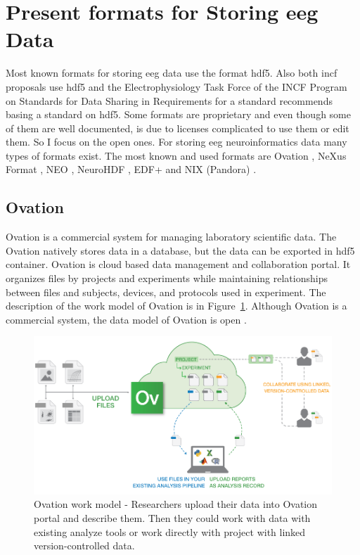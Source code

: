 \section{Present formats for Storing \gls{eeg} Data}
Most known formats for storing \gls{eeg} data use the format \gls{hdf5}. Also both \gls{incf} proposals use \gls{hdf5} and the Electrophysiology Task Force of the INCF Program on Standards for Data Sharing in Requirements for a standard recommends basing a standard on \gls{hdf5}. \cite{requirements} Some formats are proprietary and even though some of them are well documented, is due to licenses complicated to use them or edit them. So I focus on the open ones. For storing \gls{eeg} neuroinformatics data many types of formats exist. The most known and used formats are Ovation \cite{ovation}, NeXus Format \cite{nexus}, NEO \cite{neo}, NeuroHDF \cite{neurohdf}, EDF+ \cite{kemp2003} and NIX (Pandora) \cite{pandora}. 

\subsection{Ovation}
Ovation is a commercial system for managing laboratory scientific data. The Ovation natively stores data in a database, but the data can be exported in \gls{hdf5} container. Ovation is cloud based data management and collaboration portal. It organizes files by projects and experiments while maintaining relationships between files and subjects, devices, and protocols used in experiment. \cite{ovation2} The description of the work model of Ovation is in Figure~\ref{ovation_work}. Although Ovation is a commercial system, the data model of Ovation is open \cite{ovation_m}. 

\begin{figure}
	\begin{center}
		\includegraphics[scale=0.43]{obrazky/ovation.png}
		\caption{Ovation work model - Researchers upload their data into Ovation portal and describe them. Then they could work with data with existing analyze tools or work directly with project with linked version-controlled data. \cite{ovation2}}
		\label{ovation_work}
	\end{center}
\end{figure}

